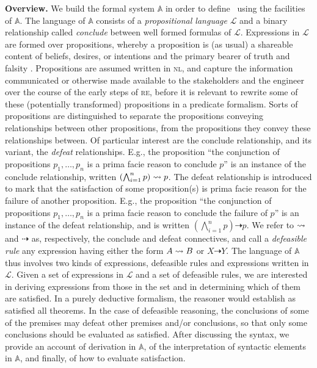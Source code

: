 \documentclass[10pt, conference, compsocconf]{IEEEtran}
\begin{document}
\textbf{Overview.} We build the formal system $\mathbb{A}$ in order to define \nlref\ using the facilities of $\mathbb{A}$. The language of $\mathbb{A}$ consists of a \textit{propositional language} $\mathcal{L}$ and a binary relationship called \textit{conclude} between well formed formulas of $\mathcal{L}$. Expressions in $\mathcal{L}$ are formed over propositions, whereby a proposition is (as usual) a shareable content of beliefs, desires, or intentions and the primary bearer of truth and falsity \cite{McGrath:2008:SEP}. Propositions are assumed written in \textsc{nl}, and capture the information communicated or otherwise made available to the stakeholders and the engineer over the course of the early steps of \textsc{re}, before it is relevant to rewrite some of these (potentially transformed) propositions in a predicate formalism. Sorts of propositions are distinguished to separate the propositions conveying relationships between other propositions, from the propositions they convey these relationships between. Of particular interest are the conclude relationship, and its variant, the \textit{defeat} relationships. E.g., the proposition ``\textsf{the conjunction of propositions} $p_{1}, \ldots, p_{n}$ \textsf{is a prima facie reason to conclude} $p$'' is an instance of the conclude relationship, written $\left(\bigwedge_{i=1}^{n}p \right) \rightsquigarrow p$. The defeat relationship is introduced to mark that the satisfaction of some proposition(s) is prima facie reason for the failure of another proposition. E.g., the proposition ``\textsf{the conjunction of propositions} $p_{1}, \ldots, p_{n}$ \textsf{is a prima facie reason to conclude the failure of} $p$'' is an instance of the defeat relationship, and is written $\left(\bigwedge_{i=1}^{n}p \right) \dashrightarrow p$. We refer to $\rightsquigarrow$ and $\dashrightarrow$ as, respectively, the conclude and defeat connectives, and call a \textit{defeasible rule} any expression having either the form $A \rightsquigarrow B$ or $X \dashrightarrow Y$. The language of $\mathbb{A}$ thus involves two kinds of expressions, defeasible rules and expressions written in $\mathcal{L}$. Given a set of expressions in $\mathcal{L}$ and a set of defeasible rules, we are interested in deriving expressions from those in the set and in determining which of them are satisfied. In a purely deductive formalism, the reasoner would establish as satisfied all theorems. In the case of defeasible reasoning, the conclusions of some of the premises may defeat other premises and/or conclusions, so that only some conclusions should be evaluated as satisfied. After discussing the syntax, we provide an account of derivation in $\mathbb{A}$, of the interpretation of syntactic elements in $\mathbb{A}$, and finally, of how to evaluate satisfaction.
\end{document}

